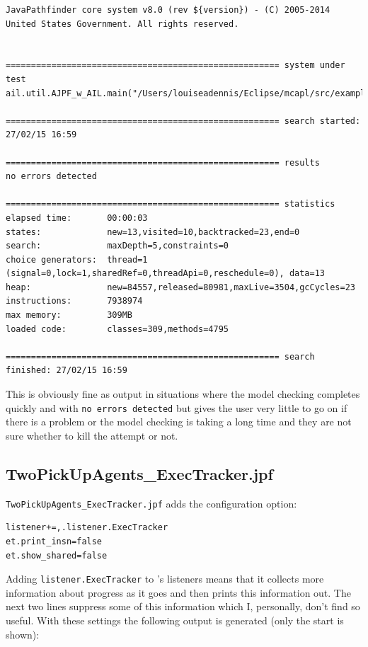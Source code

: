 \begin{verbatim}
JavaPathfinder core system v8.0 (rev ${version}) - (C) 2005-2014 United States Government. All rights reserved.


====================================================== system under test
ail.util.AJPF_w_AIL.main("/Users/louiseadennis/Eclipse/mcapl/src/examples/gwendolen/ajpf_tutorials/tutorial2/TwoPickUpAgents.ail","/Users/louiseadennis/Eclipse/mcapl/src/examples/gwendolen/ajpf_tutorials/tutorial2/PickUpAgent.psl","1")

====================================================== search started: 27/02/15 16:59

====================================================== results
no errors detected

====================================================== statistics
elapsed time:       00:00:03
states:             new=13,visited=10,backtracked=23,end=0
search:             maxDepth=5,constraints=0
choice generators:  thread=1 (signal=0,lock=1,sharedRef=0,threadApi=0,reschedule=0), data=13
heap:               new=84557,released=80981,maxLive=3504,gcCycles=23
instructions:       7938974
max memory:         309MB
loaded code:        classes=309,methods=4795

====================================================== search finished: 27/02/15 16:59
\end{verbatim}

This is obviously fine as output in situations where the model checking completes quickly and with \texttt{no errors detected} but gives the user very little to go on if there is a problem or the model checking is taking a long time and they are not sure whether to kill the attempt or not.

\subsection{TwoPickUpAgents\_ExecTracker.jpf}

\texttt{TwoPickUpAgents\_ExecTracker.jpf} adds the configuration option:

\begin{verbatim}
listener+=,.listener.ExecTracker
et.print_insn=false
et.show_shared=false
\end{verbatim}

Adding \texttt{listener.ExecTracker} to \jpf's listeners means that it collects more information about progress as it goes and then prints this information out.  The next two lines suppress some of this information which I, personally, don't find so useful.  With these settings the following output is generated (only the start is shown):

